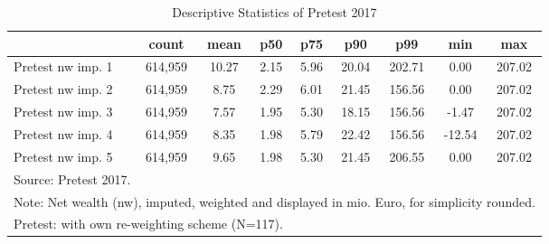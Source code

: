 \begin{table}[htbp]\centering
\def\sym#1{\ifmmode^{#1}\else\(^{#1}\)\fi}
\caption{Descriptive Statistics of Pretest 2017}
\begin{tabular}{l*{1}{cccccccc}}
\hline\hline
                                            &       count&        mean&         p50&         p75&         p90&         p99&         min&         max\\
\hline
Pretest nw imp. 1                           &     614,959&       10.27&        2.15&        5.96&       20.04&      202.71&        0.00&      207.02\\
Pretest nw imp. 2                           &     614,959&        8.75&        2.29&        6.01&       21.45&      156.56&        0.00&      207.02\\
Pretest nw imp. 3                           &     614,959&        7.57&        1.95&        5.30&       18.15&      156.56&       -1.47&      207.02\\
Pretest nw imp. 4                           &     614,959&        8.35&        1.98&        5.79&       22.42&      156.56&      -12.54&      207.02\\
Pretest nw imp. 5                           &     614,959&        9.65&        1.98&        5.30&       21.45&      206.55&        0.00&      207.02\\
\hline\hline
\multicolumn{9}{l}{\footnotesize Source: Pretest 2017.}\\
\multicolumn{9}{l}{\footnotesize Note: Net wealth (nw), imputed, weighted and displayed in mio. Euro, for simplicity rounded.}\\
\multicolumn{9}{l}{\footnotesize Pretest: with own re-weighting scheme (N=117).}\\
\end{tabular}
\end{table}
